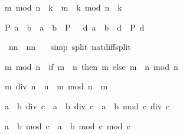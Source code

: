 \begin{isabellebody}
\begin{isamarkuptext}
\begin{isabelle}%
m\ mod\ n\ {\isacharasterisk}\ k\ {\isacharequal}\ m\ {\isacharasterisk}\ k\ mod\ {\isacharparenleft}n\ {\isacharasterisk}\ k{\isacharparenright}%
\end{isabelle}

\begin{isabelle}%
P\ {\isacharparenleft}a\ {\isacharminus}\ b{\isacharparenright}\ {\isacharequal}\ {\isacharparenleft}{\isacharparenleft}a\ {\isacharless}\ b\ {\isasymlongrightarrow}\ P\ {}{\isacharparenright}\ {\isasymand}\ {\isacharparenleft}{\isasymforall}d{\isachardot}\ a\ {\isacharequal}\ b\ {\isacharplus}\ d\ {\isasymlongrightarrow}\ P\ d{\isacharparenright}{\isacharparenright}%
\end{isabelle}
%
\end{isamarkuptext}%
\ {\isachardoublequote}{\isacharparenleft}n{\isacharminus}{}{\isacharparenright}{\isacharasterisk}{\isacharparenleft}n{\isacharplus}{}{\isacharparenright}\ {\isacharequal}\ n{\isacharasterisk}n\ {\isacharminus}\ {}{\isachardoublequote}\isanewline
{}\ {\isacharparenleft}simp\ split{\isacharcolon}\ nat{\isacharunderscore}diff{\isacharunderscore}split{\isacharparenright}\isanewline
{}%
\begin{isamarkuptext}%
\begin{isabelle}%
m\ mod\ n\ {\isacharequal}\ {\isacharparenleft}if\ m\ {\isacharless}\ n\ then\ m\ else\ {\isacharparenleft}m\ {\isacharminus}\ n{\isacharparenright}\ mod\ n{\isacharparenright}%
\end{isabelle}

\begin{isabelle}%
m\ div\ n\ {\isacharasterisk}\ n\ {\isacharplus}\ m\ mod\ n\ {\isacharequal}\ m%
\end{isabelle}


\begin{isabelle}%
a\ {\isacharasterisk}\ b\ div\ c\ {\isacharequal}\ a\ {\isacharasterisk}\ {\isacharparenleft}b\ div\ c{\isacharparenright}\ {\isacharplus}\ a\ {\isacharasterisk}\ {\isacharparenleft}b\ mod\ c{\isacharparenright}\ div\ c%
\end{isabelle}

\begin{isabelle}%
a\ {\isacharasterisk}\ b\ mod\ c\ {\isacharequal}\ a\ {\isacharasterisk}\ {\isacharparenleft}b\ mod\ c{\isacharparenright}\ mod\ c%
\end{isabelle}


\end{isamarkuptext}
\end{isabellebody}
